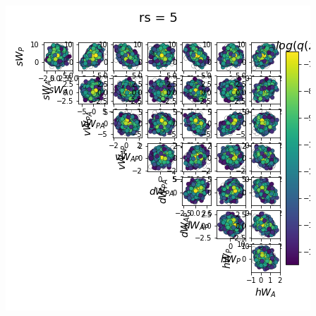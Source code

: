 \documentclass[11pt]{article}
\begin{document}
\begin{center}
\includegraphics[scale=0.33]{figs/Z_SC_full_c=0_p=80_rs=5.png}
\end{center}
\end{document}
